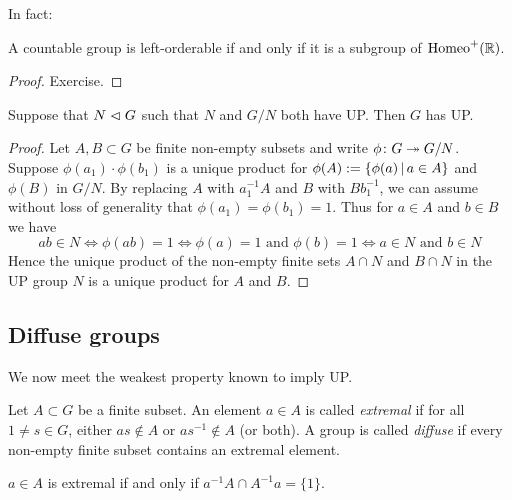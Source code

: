 In fact:

\begin{proposition}
    A countable group is left-orderable if and only if it is a subgroup of $\mathrm{Homeo}^+(\mathbb{R})$.
\end{proposition}

\begin{proof}
    Exercise.
\end{proof}

\begin{proposition}
    Suppose that $N \vartriangleleft G$ such that $N$ and $G / N$ both have UP.
    Then $G$ has UP.
\end{proposition}

\begin{proof}
    Let $A, B \subset G$ be finite non-empty subsets and write $\phi \colon G \twoheadrightarrow G / N$.
    Suppose $\phi(a_1) \cdot \phi(b_1)$ is a unique product for $\phi(A) := \left\{ \phi(a) \,\middle|\, a \in A \right\}$ and $\phi(B)$ in $G/N$.
    By replacing $A$ with $a_1^{-1} A$ and $B$ with $B b_1^{-1}$, we can assume without loss of generality that $\phi(a_1) = \phi(b_1) = 1$.
    Thus for $a \in A$ and $b \in B$ we have \[
        a b \in N \Leftrightarrow \phi(a b) = 1 \Leftrightarrow \phi(a) = 1 \text{ and } \phi(b) = 1 \Leftrightarrow a \in N \text{ and } b \in N
    \]
    Hence the unique product of the non-empty finite sets $A \cap N$ and $B \cap N$ in the UP group $N$ is a unique product for $A$ and $B$.
\end{proof}

\subsection*{Diffuse groups}

We now meet the weakest property known to imply UP.

\begin{definition}
    Let $A \subset G$ be a finite subset.
    An element $a \in A$ is called \emph{extremal} if for all $1 \neq s \in G$, either $as \notin A$ or $a s^{-1} \notin A$ (or both).
    A group is called \emph{diffuse} if every non-empty finite subset contains an extremal element.
\end{definition}


\begin{remark}
    \label{remark:diffuse_intersection}
    $a \in A$ is extremal if and only if $a^{-1} A \cap A^{-1} a = \{1\}$.
\end{remark}

